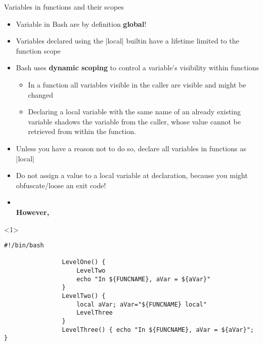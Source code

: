 \begin{frame}[fragile]{Variables in functions and their scopes}
    \vspace{-4mm}
    \begin{overlayarea}{\textwidth}{0.7\textheight}
        \begin{itemize}
            \item Variable in Bash are by definition \alert{\textbf{global}}!
            \item Variables declared using the \bash|local| builtin have a lifetime limited to the function scope
            \item Bash uses \textbf{dynamic scoping} to control a variable's visibility within functions
                  \begin{itemize}
                      \item In a function all variables visible in the caller are visible and might be changed
                      \item Declaring a local variable with the same name of an already existing variable shadows the variable from the caller, whose value cannot be retrieved from within the function.
                  \end{itemize}
            \item<only@3-> Unless you have a reason not to do so, declare all variables in functions as \bash|local|
            \item<only@3-> Do not assign a value to a local variable at declaration, because you might obfuscate/loose an exit code!
            \item<only@4-> \\
                           \textbf{However,} 
        \end{itemize}
        \begin{onlyenv}<1>
            \begin{lstlisting}[style=MyBash]
                #!/bin/bash
                
                LevelOne() {
                    LevelTwo
                    echo "In ${FUNCNAME}, aVar = ${aVar}"
                }
                LevelTwo() {
                    local aVar; aVar="${FUNCNAME} local"
                    LevelThree
                }
                LevelThree() { echo "In ${FUNCNAME}, aVar = ${aVar}"; }
                

\end{lstlisting}
\end{onlyenv}
\end{overlayarea}
\end{frame}
